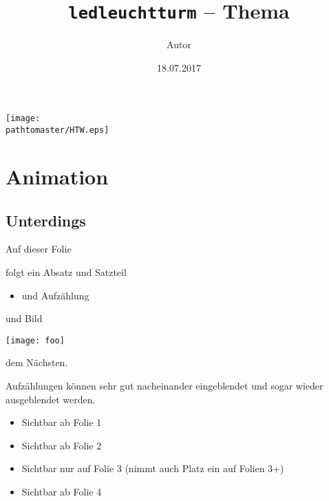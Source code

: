 \documentclass[ignorenonframetext, 11pt, table]{beamer}
\author{Autor}
\title{\texttt{ledleuchtturm} -- Thema}
\date{18.07.2017}
\gdef\pathtomaster{../_LaTeX_master}
\begin{document}
\begin{frame}[plain]
\begin{center}
\texttt{[image: \\pathtomaster/HTW.eps]}
\end{center}
\maketitle
\end{frame}

\section*{Animation}
\subsection*{Unterdings}
\begin{frame}
Auf dieser Folie \pause
 
folgt ein Absatz \pause und Satzteil \pause {}
\begin{itemize}
\item und Aufzählung
\end{itemize} \pause
und Bild 
\begin{center}
\texttt{[image: foo]}
\end{center} 
\pause
dem Nächsten.
\end{frame}

\begin{frame}
Aufzählungen können sehr gut nacheinander eingeblendet und sogar wieder ausgeblendet werden. 
\begin{itemize}
\item<1-> Sichtbar ab Folie 1
\item<2-> Sichtbar ab Folie 2
\item<3> Sichtbar nur auf Folie 3 (nimmt auch Platz ein auf Folien 3+)
\item<4-> Sichtbar ab Folie 4
\end{itemize}
\end{frame}
\end{document}
